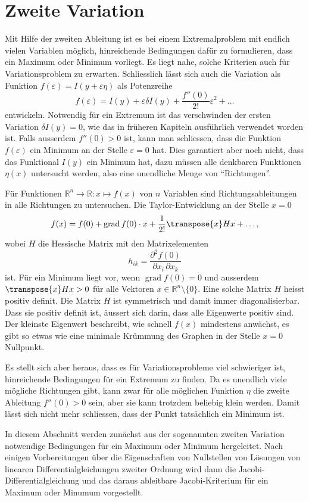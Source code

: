 %
%
%
\chapter{Zweite Variation
\label{buch:chapter:variation2}}
Mit Hilfe der zweiten Ableitung ist es bei einem Extremalproblem
mit endlich vielen Variablen möglich, hinreichende Bedingungen dafür
zu formulieren, dass ein Maximum oder Minimum vorliegt.
Es liegt nahe, solche Kriterien auch für Variationsproblem
zu erwarten.
Schliesslich lässt sich auch die Variation als Funktion
$f(\varepsilon) = I(y+\varepsilon\eta)$ als Potenzreihe
\[
f(\varepsilon)
=
I(y) + \varepsilon \delta I(y) + \frac{f''(0)}{2!}\varepsilon^2 + \dots
\]
entwickeln.
Notwendig für ein Extremum ist das verschwinden der ersten Variation
$\delta I(y)=0$, wie das in früheren Kapiteln ausführlich verwendet
worden ist.
Falls ausserdem $f''(0)>0$ ist, kann man schliessen, dass die
Funktion $f(\varepsilon)$ ein Minimum an der Stelle $\varepsilon=0$
hat.
Dies garantiert aber noch nicht, dass das Funktional $I(y)$
ein Minimum hat, dazu müssen alle denkbaren Funktionen $\eta(x)$
untersucht werden, also eine unendliche Menge von ``Richtungen''.

Für Funktionen $\mathbb{R}^n\to\mathbb{R}: x\mapsto f(x)$ von
$n$ Variablen sind Richtungsableitungen in alle Richtungen zu
untersuchen.
Die Taylor-Entwicklung an der Stelle $x=0$
\[
f(x)
=
f(0)
+
\operatorname{grad}f(0)\cdot x
+
\frac{1}{2!}\transpose{x} H x
+
\dots,
\]
wobei $H$ die Hessische Matrix mit den Matrixelementen
\[
h_{ik}
=
\frac{\partial^2\! f(0)}{\partial x_i\,\partial x_k}
\]
ist.
Für ein Minimum liegt vor, wenn $\operatorname{grad}f(0)=0$ und ausserdem
$\transpose{x}Hx>0$ für alle Vektoren $x\in\mathbb{R}^n\setminus\{0\}$.
Eine solche Matrix $H$ heisst positiv definit.
Die Matrix $H$ ist symmetrisch und damit immer diagonalisierbar.
Dass sie positiv definit ist, äussert sich darin, dass alle Eigenwerte
positiv sind.
Der kleinste Eigenwert beschreibt, wie schnell $f(x)$ mindestens
anwächst, es gibt so etwas wie eine minimale Krümmung des Graphen
in der Stelle $x=0$ Nullpunkt.

Es stellt sich aber heraus, dass es für Variationsprobleme viel
schwieriger ist, hinreichende Bedingungen für ein Extremum zu finden.
Da es unendlich viele mögliche Richtungen gibt, kann zwar für alle
möglichen Funktion $\eta$ die zweite Ableitung $f''(0)>0$ sein, aber 
sie kann trotzdem beliebig klein werden.
Damit lässt sich nicht mehr schliessen, dass der Punkt tatsächlich
ein Minimum ist.

In diesem Abschnitt werden zunächst aus der sogenannten zweiten
Variation notwendige Bedingungen für ein Maximum oder Minimum
hergeleitet.
Nach einigen Vorbereitungen über die Eigenschaften von Nullstellen
von Lösungen von linearen Differentialgleichungen zweiter Ordnung
wird dann die Jacobi-Differentialgleichung und das daraus ableitbare
Jacobi-Kriterium für ein Maximum oder Minumum vorgestellt.







